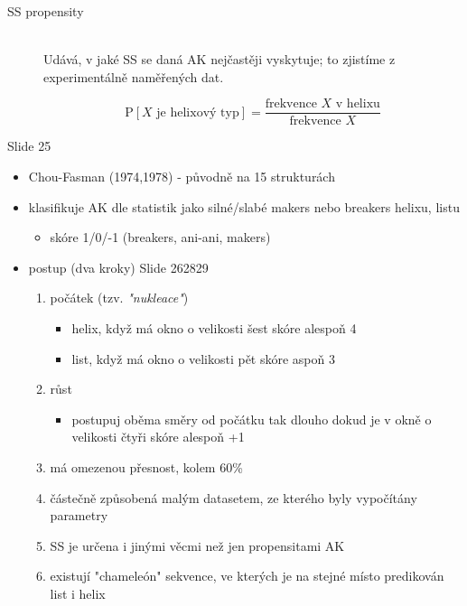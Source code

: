 \documentclass[DIV=8]{scrreprt}
\begin{document}
\begin{description}
\item[SS propensity]\hfill \\
Udává, v jaké SS se daná AK nejčastěji vyskytuje; to zjistíme z experimentálně naměřených dat.

\[\text{P}[X \text{ je helixový typ}] = \frac{\text{frekvence } X \text{ v helixu}}{\text{frekvence } X}\]

\end{description}


Slide 25
\begin{itemize}
    \item Chou-Fasman (1974,1978) - původně na 15 strukturách
    \item klasifikuje AK dle statistik jako silné/slabé makers nebo breakers helixu, listu
\begin{itemize}
    \item skóre 1/0/-1 (breakers, ani-ani, makers)
\end{itemize}

    \item postup (dva kroky) Slide 262829
\begin{enumerate}
    \item počátek (tzv. \emph{"nukleace"})
\begin{itemize}
    \item helix, když má okno o velikosti šest skóre alespoň 4
    \item list, když má okno o velikosti pět skóre aspoň 3
\end{itemize}

    \item růst
\begin{itemize}
    \item postupuj oběma směry od počátku tak dlouho dokud je v okně o velikosti čtyři skóre alespoň +1
\end{itemize}

    \item má omezenou přesnost, kolem 60\%
    \item částečně způsobená malým datasetem, ze kterého byly vypočítány parametry
    \item SS je určena i jinými věcmi než jen propensitami AK
    \item existují "chameleón" sekvence, ve kterých je na stejné místo predikován list i helix
\end{enumerate}

\end{itemize}
\end{document}
